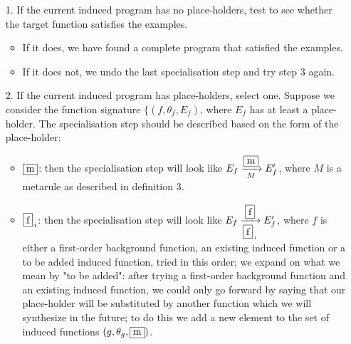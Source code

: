 \begin{itemize}
\item[1.] If the current induced program has no place-holders, test to see whether the target function satisfies the examples.
\begin{itemize}
\item If it does, we have found a complete program that satisfied the examples.
\item If it does not, we undo the last specialisation step and try step 3 again.
\end{itemize}
\item[2.] If the current induced program has place-holders, select one. Suppose we consider the function signature $\{(f, \theta_{f}, E_{f})$, where $E_{f}$ has at least a place-holder. The specialisation step should be described based on the form of the place-holder:
\begin{itemize}
\item $\fbox{m}$: then the specialisation step will look like $E_{f} \xrightarrow[M]{\fbox{m}} E'_{f}$, where $M$ is a metarule as described in definition 3.
\item $\fbox{f}_{\,i}$: then the specialisation step will look like $E_{f} \xrightarrow[\fbox{f}_{\,i}]{\fbox{f}} E'_{f}$, where $f$ is either a first-order background function, an existing induced function or a to be added induced function, tried in this order; we expand on what we mean by "to be added": after trying a first-order background function and an existing induced function, we could only go forward by saying that our place-holder will be substituted by another function which we will synthesize in the future; to do this we add a new element to the set of induced functions $(g, \theta_{g}, \fbox{m})$.
\end{itemize}
\end{itemize}
